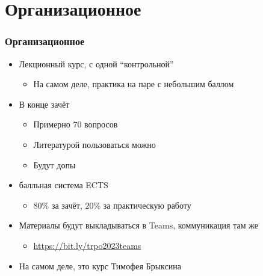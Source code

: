 \documentclass{../../slides-style}
\begin{document}
    \begin{frame}[plain]
        \titlepage
    \end{frame}

    \section{Организационное}

    \begin{frame}
        \frametitle{Организационное}
        \begin{itemize}
            \item Лекционный курс, с одной ``контрольной''
            \begin{itemize}
                \item На самом деле, практика на паре с небольшим баллом
            \end{itemize}
            \item В конце зачёт
            \begin{itemize}
                \item Примерно 70 вопросов
                \item Литературой пользоваться можно
                \item Будут допы
            \end{itemize}
            \item балльная система ECTS
            \begin{itemize}
                \item 80\% за зачёт, 20\% за практическую работу
            \end{itemize}
            \item Материалы будут выкладываться в Teams, коммуникация там же
            \begin{itemize}
                \item \url{https://bit.ly/trpo2023teams}
            \end{itemize}
            \item На самом деле, это курс Тимофея Брыксина
        \end{itemize}
    \end{frame}
\end{document}
